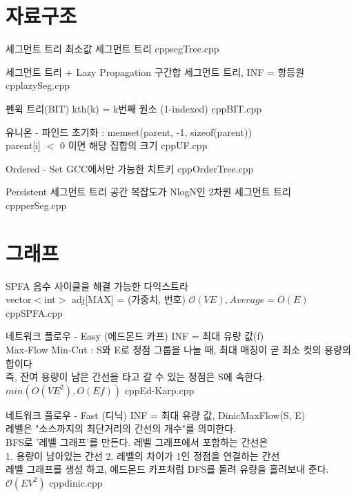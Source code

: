 \documentclass[landscape, 10pt, a4paper, oneside, twocolumn]{extarticle}
\begin{document}
\maketitlepage





\section{자료구조}

\Algorithm
{세그먼트 트리}
{최소값 세그먼트 트리}
{}
{cpp}{segTree.cpp}

\Algorithm
{세그먼트 트리 + Lazy Propagation}
{구간합 세그먼트 트리, INF = 항등원}
{}
{cpp}{lazySeg.cpp}

\Algorithm
{펜윅 트리(BIT)}
{kth(k) = k번째 원소 (1-indexed)}
{}
{cpp}{BIT.cpp}

\Algorithm
{유니온 - 파인드}
{초기화 : memset(parent, -1, sizeof(parent))\\
parent[i] ${<}$ 0 이면 해당 집합의 크기
}
{}
{cpp}{UF.cpp}

\Algorithm
{Ordered - Set}
{GCC에서만 가능한 치트키}
{}
{cpp}{OrderTree.cpp}

\Algorithm
{Persistent 세그먼트 트리}
{공간 복잡도가 NlogN인 2차원 세그먼트 트리}
{}
{cpp}{perSeg.cpp}

\section{그래프}

\Algorithm
{SPFA}
{음수 사이클을 해결 가능한 다익스트라\\
vector${<}$int${>}$ adj[MAX] = (가중치, 번호)}
{$\mathcal{O}(VE),{}Average = {O}(E)$}
{cpp}{SPFA.cpp}

\Algorithm
{네트워크 플로우 - Easy (에드몬드 카프)}
{INF = 최대 유량 값(f)\\
Max-Flow Min-Cut : S와 E로 정점 그룹을 나눌 때, 최대 매칭이 곧 최소 컷의 용량의 합이다\\
즉, 잔여 용량이 남은 간선을 타고 갈 수 있는 정점은 S에 속한다.}
{$\mathcal {}min({O}(VE^2), {O}(Ef))$}
{cpp}{Ed-Karp.cpp}

\Algorithm
{네트워크 플로우 - Fast (디닉)}
{INF = 최대 유량 값,  DinicMaxFlow(S, E)\\
레벨은 "소스까지의 최단거리의 간선의 개수"를 의미한다.\\
BFS로 '레벨 그래프'를 만든다. 레벨 그래프에서 포함하는 간선은\\
1. 용량이 남아있는 간선 2. 레벨의 차이가 1인 정점을 연결하는 간선\\
레벨 그래프를 생성 하고, 에드몬드 카프처럼 DFS를 돌려 유량을 흘려보내 준다.
}
{$\mathcal{O}(EV^2)$}
{cpp}{dinic.cpp}
\end{document}
